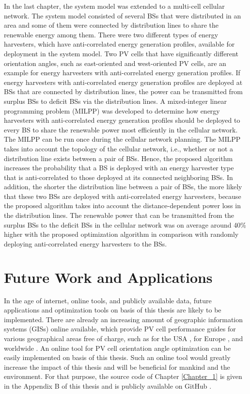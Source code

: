In the last chapter, the system model was extended to a multi-cell cellular network. The system model consisted of several BSs that were distributed in an area and some of them were connected by distribution lines to share the renewable energy among them. There were two different types of energy harvesters, which have anti-correlated energy generation profiles, available for deployment in the system model. Two PV cells that have significantly
different orientation angles, such as east-oriented and west-oriented PV cells, are an example
for energy harvesters with anti-correlated energy generation profiles. If energy harvesters with anti-correlated energy generation profiles are deployed at BSs that are connected by distribution lines, the power can be transmitted from surplus BSs to deficit BSs via the distribution lines. A mixed-integer linear programming problem (MILPP) was developed to determine how energy harvesters with anti-correlated energy generation profiles should be deployed to every BS to share the renewable power most efficiently in the cellular network. 
The MILPP can be run once during the cellular network planning. 
The MILPP takes into account the topology of the cellular network, i.e., whether or not a distribution line exists between a pair of
BSs. Hence, the proposed algorithm increases the probability that a BS is deployed with an energy harvester type that is anti-correlated to those deployed at its connected neighboring BSs. In addition, the shorter the distribution line between a pair of BSs, the more likely that these two BSs are deployed with anti-correlated energy harvesters, because the proposed algorithm takes into account the distance-dependent power loss in the distribution lines. 
The renewable power that can be transmitted from the surplus BSs to the deficit BSs in the cellular network was on average around 40\% higher with the proposed optimization algorithm in comparison with randomly deploying anti-correlated energy harvesters to the BSs.




\section{Future Work and Applications}

In the age of internet, online tools, and publicly available data, future applications and optimization tools on basis of this thesis are likely to be implemented. There are already an increasing amount of geographic information systems (GISs) online available, which provide PV cell performance guides for various geographical areas free of charge, such as for the USA \cite{usa}, for Europe \cite{PVGIS}, and worldwide \cite{worldwide,worldwide2}. An online tool for PV cell orientation angle optimization can be easily implemented on basis of this thesis. Such an online tool would greatly increase the impact of this thesis and will be beneficial for mankind and the environment. For that purpose, the source code of Chapter \ref{Chapter_1} is given in the Appendix B of this thesis and is publicly available on GitHub \cite{DOBEN_GITHUB}.

